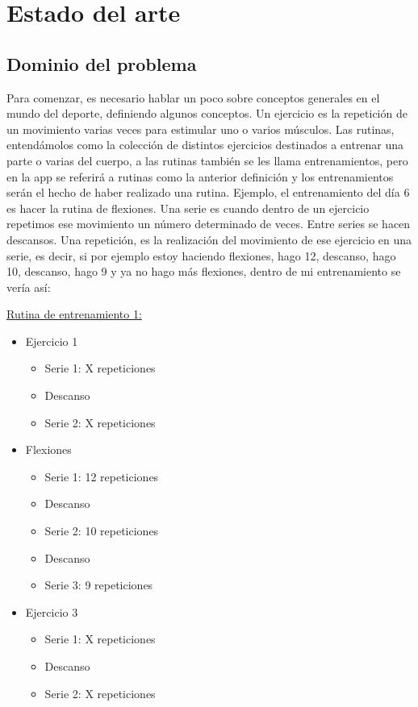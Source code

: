 \chapter{Estado del arte}

\section{Dominio del problema}
Para comenzar, es necesario hablar un poco sobre conceptos generales en el mundo del deporte, definiendo algunos conceptos. Un ejercicio es la repetición de un movimiento varias veces para estimular uno o varios músculos. Las rutinas, entendámolos como la colección de distintos ejercicios destinados a entrenar una parte o varias del cuerpo, a las rutinas también se les llama entrenamientos, pero en la app se referirá a rutinas como la anterior definición y los entrenamientos serán el hecho de haber realizado una rutina. Ejemplo, el entrenamiento del día 6 es hacer la rutina de flexiones. Una serie es cuando dentro de un ejercicio repetimos ese movimiento un número determinado de veces. Entre series se hacen descansos. Una repetición, es la realización del movimiento de ese ejercicio en una serie, es decir, si por ejemplo estoy haciendo flexiones, hago 12, descanso, hago 10, descanso, hago 9 y ya no hago más flexiones, dentro de mi entrenamiento se vería así:

\underline {Rutina de entrenamiento 1:}
\begin{itemize}
	\item Ejercicio 1
	\begin{itemize}
		\item Serie 1: X repeticiones
		\item Descanso
		\item Serie 2: X repeticiones
	\end{itemize}
	\item Flexiones
	\begin{itemize}
		\item Serie 1: 12 repeticiones
		\item Descanso
		\item Serie 2: 10 repeticiones 
		\item Descanso
		\item Serie 3: 9 repeticiones
	\end{itemize}
	\item Ejercicio 3
	\begin{itemize}
		\item Serie 1: X repeticiones
		\item Descanso
		\item Serie 2: X repeticiones
	\end{itemize}
\end{itemize}

